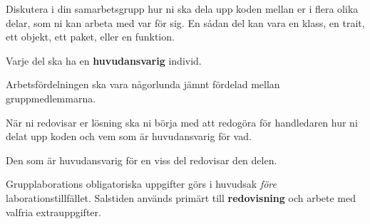 \item
Diskutera i din samarbetsgrupp hur ni ska dela upp koden mellan er i flera olika delar, som ni kan arbeta med var för sig. En sådan del kan vara en klass, en trait, ett objekt, ett paket, eller en funktion.
\item
Varje del ska ha en \textbf{huvudansvarig} individ.
\item
Arbetsfördelningen ska vara någorlunda jämnt fördelad mellan gruppmedlemmarna.
\item
När ni redovisar er lösning ska ni börja med att redogöra för handledaren hur ni delat upp koden och vem som är huvudansvarig för vad.
\item
Den som är huvudansvarig för en viss del redovisar den delen.
\item
Grupplaborations obligatoriska uppgifter görs i huvudsak \emph{före} laborationstillfället. Salstiden används primärt till \textbf{redovisning} och arbete med valfria extrauppgifter.
